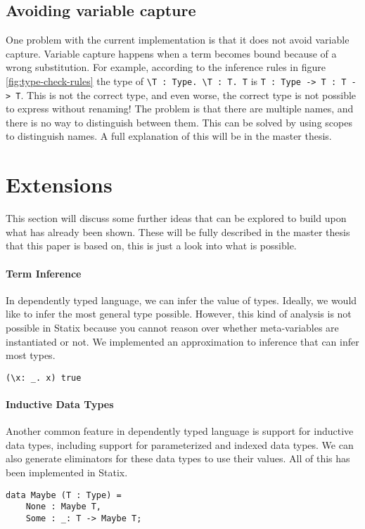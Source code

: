 \documentclass[a4paper,UKenglish,cleveref, autoref, thm-restate]{oasics-v2021}
\begin{document}
\subsection{Avoiding variable capture}
One problem with the current implementation is that it does not avoid variable capture. Variable capture happens when a term becomes bound because of a wrong substitution. For example, according to the inference rules in figure \ref{fig:type-check-rules} the type of \verb|\T : Type. \T : T. T| is \verb|T : Type -> T : T -> T|. This is not the correct type, and even worse, the correct type is not possible to express without renaming! The problem is that there are multiple names, and there is no way to distinguish between them. This can be solved by using scopes to distinguish names. A full explanation of this will be in the master thesis. 

\section{Extensions}
\label{sec:extensions}
This section will discuss some further ideas that can be explored to build upon what has already been shown. These will be fully described in the master thesis that this paper is based on, this is just a look into what is possible.

\paragraph*{Term Inference}
In dependently typed language, we can infer the value of types. Ideally, we would like to infer the most general type possible. However, this kind of analysis is not possible in Statix because you cannot reason over whether meta-variables are instantiated or not. We implemented an approximation to inference that can infer most types.
\begin{lstlisting}
(\x: _. x) true
\end{lstlisting}

\paragraph*{Inductive Data Types}
Another common feature in dependently typed language is support for inductive data types, including support for parameterized and indexed data types. We can also generate eliminators for these data types to use their values. All of this has been implemented in Statix. 
\begin{lstlisting}
data Maybe (T : Type) = 
    None : Maybe T,
    Some : _: T -> Maybe T;
\end{lstlisting}
\end{document}
